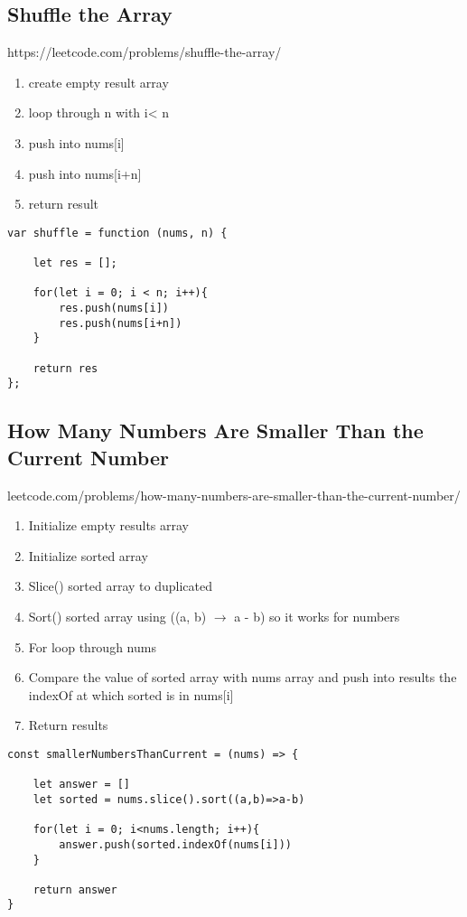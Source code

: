 \documentclass[10pt]{article}
\begin{document}
\medskip %


\pagebreak
\medskip %
\subsection{Shuffle the Array}
https://leetcode.com/problems/shuffle-the-array/

\begin{enumerate}
	\item create empty result array
	\item loop through n with i< n 
	\item push into nums[i] 
	\item push into nums[i+n]
	\item return result
\end{enumerate}

\begin{lstlisting}[title=Solution shuffle, captionpos=t]
var shuffle = function (nums, n) {
    
    let res = [];

    for(let i = 0; i < n; i++){
        res.push(nums[i])
        res.push(nums[i+n])
    }

    return res
};
\end{lstlisting}

\medskip %

\pagebreak
\medskip %
\subsection{How Many Numbers Are Smaller Than the Current Number}
leetcode.com/problems/how-many-numbers-are-smaller-than-the-current-number/

\begin{enumerate}
	\item Initialize empty results array
	\item Initialize sorted array
	\item Slice() sorted array to duplicated
	\item Sort() sorted array using ((a, b) $\rightarrow$ a - b) so it works for numbers 
	\item For loop through nums
	\item Compare the value of sorted array with nums array and push into results the indexOf at which sorted is in nums[i]
	\item Return results 
\end{enumerate}

\begin{lstlisting}[title=Solution smallerNumbersThanCurrent, captionpos=t]
const smallerNumbersThanCurrent = (nums) => {

    let answer = []
    let sorted = nums.slice().sort((a,b)=>a-b)

    for(let i = 0; i<nums.length; i++){
        answer.push(sorted.indexOf(nums[i]))
    }

    return answer
}
\end{lstlisting}
\end{document}
